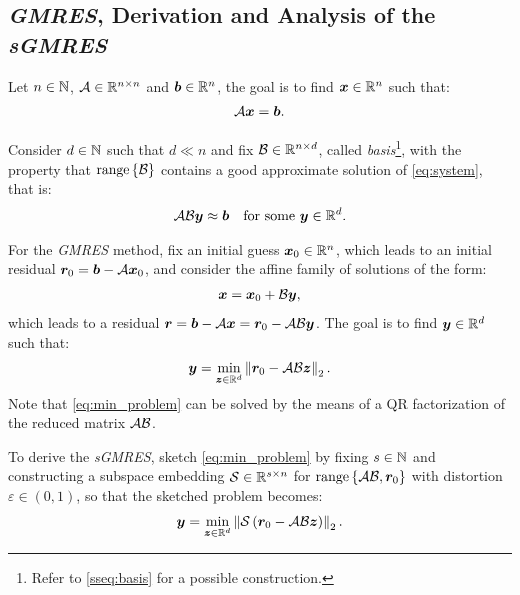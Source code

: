 \subsection{\textit{GMRES}, Derivation and Analysis of the \textit{sGMRES}}

Let $n \in \mathbb{N}$,  $\mathcal{A} \in \mathbb{R}^{n \times n}$ and $\bm{b} \in \mathbb{R}^{n}$, the goal is to find $\bm{x} \in \mathbb{R}^{n}$ such that:
\begin{align}
    \mathcal{A} \bm{x} = \bm{b}. \label{eq:system}
\end{align}

Consider $d \in \mathbb{N}$ such that $d \ll n$ and fix $\mathcal{B} \in \mathbb{R}^{n \times d}$, called \textit{basis}\footnote{Refer to \cref{sseq:basis} for a possible construction.}, with the property that $\operatorname*{range}\left\{\mathcal{B}\right\}$ contains a good approximate solution of \cref{eq:system}, that is:
\begin{align}
    \mathcal{A} \mathcal{B} \bm{y} &\approx \bm{b} &\text{for some } \bm{y} \in \mathbb{R}^{d}. \label{eq:app_system}
\end{align}

For the \textit{GMRES} method, fix an initial guess $\bm{x}_0 \in \mathbb{R}^{n}$, which leads to an initial residual $\bm{r}_0 = \bm{b} - \mathcal{A} \bm{x}_0$, and consider the affine family of solutions of the form:
\begin{align}
    \bm{x} = \bm{x}_0 + \mathcal{B} \bm{y},
\end{align}
which leads to a residual $\bm{r} = \bm{b} - \mathcal{A} \bm{x} = \bm{r}_0 - \mathcal{A} \mathcal{B} \bm{y}$. The goal is to find $\bm{y} \in \mathbb{R}^{d}$ such that:
\begin{align}
    \bm{y} = \min_{\bm{z} \in \mathbb{R}^{d}} \left\lVert \bm{r}_0 - \mathcal{A} \mathcal{B} \bm{z} \right\rVert_2. \label{eq:min_problem}
\end{align}
Note that \cref{eq:min_problem} can be solved by the means of a QR factorization of the reduced matrix $\mathcal{A} \mathcal{B}$.

To derive the \textit{sGMRES}, sketch \cref{eq:min_problem} by fixing $s \in \mathbb{N}$ and constructing a subspace embedding $\mathcal{S} \in \mathbb{R}^{s \times n}$ for $\operatorname*{range}\left\{\mathcal{A} \mathcal{B}, \bm{r}_0\right\}$ with distortion $\varepsilon \in \left(0, 1\right)$, so that the sketched problem becomes:
\begin{align}
    \bm{y} = \min_{\bm{z} \in \mathbb{R}^{d}} \left\lVert  \mathcal{S} \left( \bm{r}_0 - \mathcal{A} \mathcal{B} \bm{z} \right) \right\rVert_2. \label{eq:sketched_min_problem}
\end{align}

